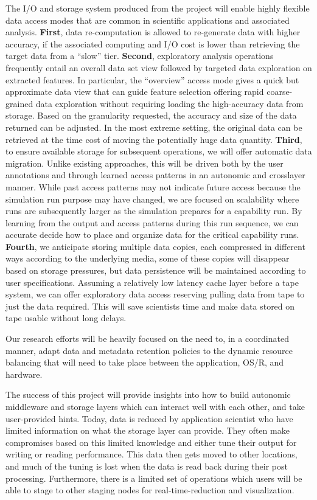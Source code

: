\documentclass[11pt,letterpaper]{article}
\begin{document}
The I/O and storage system produced from the project will
enable highly flexible data access modes that are common in scientific 
applications and associated analysis. 
\textbf{First}, data re-computation is allowed to re-generate
data with higher accuracy, if the associated computing and I/O cost is lower
than retrieving the target data from a ``slow'' tier. 
\textbf{Second}, exploratory analysis
operations frequently entail an overall data set view followed by targeted data
exploration on extracted features. 
In particular, the ``overview'' access mode gives a quick but approximate
data view that can guide feature selection offering rapid coarse-grained data
exploration without requiring loading the high-accuracy data from
storage. Based on the granularity requested, the accuracy and size of the data
returned can be adjusted. In the most extreme setting, the original data can
be retrieved at the time cost of moving the potentially huge data quantity.
\textbf{Third}, to ensure available storage for subsequent operations, we will
offer automatic data migration.
 Unlike existing approaches,
this will be driven both by the user annotations and through learned access
patterns in an autonomic and crosslayer manner.  While past access patterns may not indicate future access because
the simulation run purpose may have changed, we are focused on scalability
where runs are subsequently larger as the simulation prepares for a capability
run.  By learning from the output and access patterns during this run sequence,
we can accurate decide how to place and organize data for the critical
capability runs. 
\textbf{Fourth}, we anticipate storing multiple data copies, each
compressed in different ways according to the underlying media, some of these
copies will disappear based on storage pressures, but data persistence will be
maintained according to user specifications. Assuming a relatively low latency
cache layer before a tape system, we can offer exploratory data access
reserving pulling data from tape to just the data required. This will save
scientists time and make data stored on tape usable without long delays.

Our research efforts will be heavily focused on the need to, in a coordinated
manner, adapt data and metadata retention policies to the dynamic resource
balancing that will need to take place between the application, OS/R, and
hardware.

The success of this project will  provide insights into how to build autonomic
middleware and storage layers which can interact well with each other, and take
user-provided hints. Today, data is reduced by application scientist who have
limited information on what the storage layer can provide. They often make
compromises based on this limited knowledge and either tune their output for
writing or reading performance. This data then gets moved to other locations,
and much of the tuning is lost when the data is read back during their post
processing. Furthermore, there is a limited set of operations which users will
be able to stage to other staging nodes for real-time-reduction and
visualization. 


%
\end{document}
